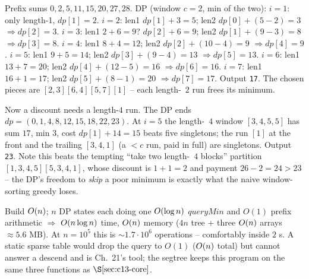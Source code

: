 \begin{tracebox}[CF 940E sample 3: n=7, c=2, a = 2 3 6 4 5 7 1]
Prefix sums \(0,2,5,11,15,20,27,28\).  DP (window \(c{=}2\), min of the two):
\(i{=}1\): only length-1, \(\mathit{dp}[1]=2\).
\(i{=}2\): len1 \(\mathit{dp}[1]{+}3{=}5\); len2 \(\mathit{dp}[0]{+}(5{-}2){=}3\)
\(\Rightarrow\mathit{dp}[2]{=}3\).
\(i{=}3\): len1 \(2{+}6{=}9\)? \(\mathit{dp}[2]{+}6{=}9\); len2
\(\mathit{dp}[1]{+}(9{-}3){=}8\) \(\Rightarrow\mathit{dp}[3]{=}8\).
\(i{=}4\): len1 \(8{+}4{=}12\); len2 \(\mathit{dp}[2]{+}(10{-}4){=}9\)
\(\Rightarrow\mathit{dp}[4]{=}9\).
\(i{=}5\): len1 \(9{+}5{=}14\); len2 \(\mathit{dp}[3]{+}(9{-}4){=}13\)
\(\Rightarrow\mathit{dp}[5]{=}13\).
\(i{=}6\): len1 \(13{+}7{=}20\); len2 \(\mathit{dp}[4]{+}(12{-}5){=}16\)
\(\Rightarrow\mathit{dp}[6]{=}16\).
\(i{=}7\): len1 \(16{+}1{=}17\); len2 \(\mathit{dp}[5]{+}(8{-}1){=}20\)
\(\Rightarrow\mathit{dp}[7]{=}17\).  Output \texttt{17}.  The chosen pieces are
\([2,3][6,4][5,7][1]\) -- each length-~\(2\) run frees its minimum.
\end{tracebox}
\begin{tracebox}[CF 940E sample 4: n=8, c=4, a = 1 3 4 5 5 3 4 1]
Now a discount needs a length-\(4\) run.  The DP ends \(\mathit{dp}=(0,1,4,8,
12,15,18,22,23)\).  At \(i{=}5\) the length-~\(4\) window \([3,4,5,5]\) has sum
\(17\), min \(3\), cost \(\mathit{dp}[1]{+}14{=}15\) beats five singletons; the
run \([1]\) at the front and the trailing \([3,4,1]\) (a \(<c\) run, paid in full)
are singletons.  Output \texttt{23}.  Note this beats the tempting
``take two length-~\(4\) blocks'' partition \([1,3,4,5][5,3,4,1]\), whose discount
is \(1{+}1{=}2\) and payment \(26{-}2{=}24>23\) -- the DP's freedom to \emph{skip}
a poor minimum is exactly what the naive window-sorting greedy loses.
\end{tracebox}

\begin{complexitybox}
Build \(O(n)\); \(n\) DP states each doing one \(O(\log n)\)
\(\mathit{queryMin}\) and \(O(1)\) prefix arithmetic \(\Rightarrow\)
\(O(n\log n)\) time, \(O(n)\) memory (\(4n\) tree + three \(O(n)\)
 arrays \(\approx 5.6\) MB).  At \(n=10^5\) this is \(\sim
1.7\cdot10^6\) operations -- comfortably inside \(2\) s.  A static sparse table
would drop the query to \(O(1)\) (\(O(n)\) total) but cannot answer a
descend and is Ch.~21's tool; the segtree keeps this program on the same three
functions as \(\secref{c13-core}\).
\end{complexitybox}


